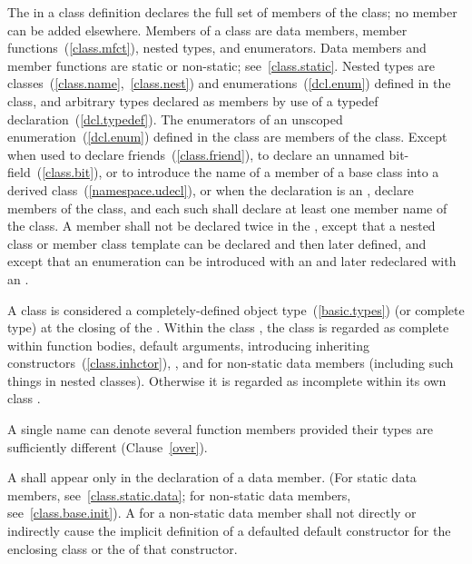 \pnum
{}%
The  in a class definition declares the
full set of members of the class; no member can be added elsewhere.
Members of a class are data members, member
functions~(\ref{class.mfct}), nested types, and enumerators. Data
members and member functions are static or non-static;
see~\ref{class.static}. Nested types are
classes~(\ref{class.name},~\ref{class.nest}) and
enumerations~(\ref{dcl.enum}) defined in the class, and arbitrary types
declared as members by use of a typedef declaration~(\ref{dcl.typedef}).
The enumerators of an unscoped enumeration~(\ref{dcl.enum}) defined in the class
are members of the class. Except when used to declare
friends~(\ref{class.friend}), to declare an unnamed bit-field~(\ref{class.bit}),
or to introduce the name of a member of a
base class into a derived
class~(\ref{namespace.udecl}), or when the declaration is an
,
 declare members of the class, and each
such  shall declare at least one member
name of the class. A member shall not be declared twice in the
, except that a nested class or member
class template can be declared and then later defined, and except that an
enumeration can be introduced with an  and later
redeclared with an .

\pnum
{}%
A class is considered a completely-defined object
type~(\ref{basic.types}) (or complete type) at the closing \tcode{\}} of
the .
Within the class
, the class is regarded as complete
within function bodies, default arguments,
 introducing inheriting
constructors~(\ref{class.inhctor}),
, and
 for non-static data members
(including such things in nested classes).
Otherwise it is regarded as incomplete within its own class
.

\pnum
\enternote
A single name can denote several function members provided their types
are sufficiently different (Clause~\ref{over}).
\exitnote

\pnum
A  shall appear only in the
declaration of a data member. (For static data members,
see~\ref{class.static.data}; for non-static data members,
see~\ref{class.base.init}).
A  for a non-static data member
shall not directly or indirectly cause the implicit definition of a
defaulted default constructor for the enclosing class or the
 of that constructor.

